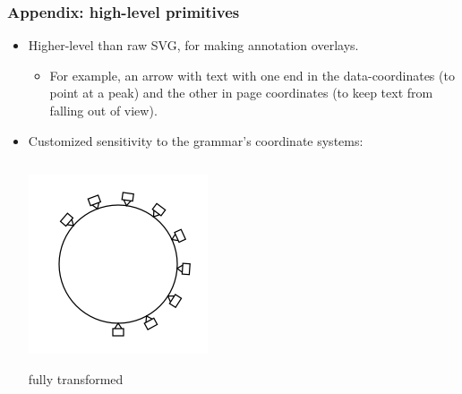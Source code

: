 \documentclass[compress]{beamer}
\begin{document}
\begin{frame}
\frametitle{Appendix: high-level primitives}
\begin{itemize}
\item Higher-level than raw SVG, for making annotation overlays.
\begin{itemize}
\item For example, an arrow with text with one end in the data-coordinates (to point at a peak) and the other in page coordinates (to keep text from falling out of view).
\end{itemize}
\item Customized sensitivity to the grammar's coordinate systems:

\begin{columns}
\begin{center}
\includegraphics[width=\linewidth]{Version2Announcement_ferris2.png}

fully transformed
\end{center}


\end{columns}
\end{itemize}
\end{frame}
\end{document}
